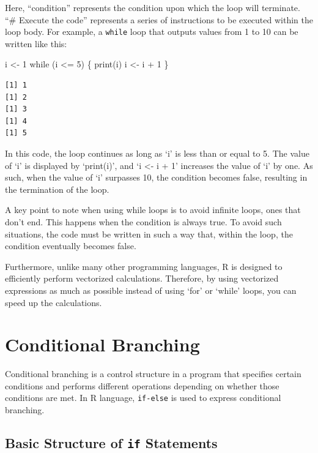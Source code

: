 \documentclass[
  a4paper,
]{book}
\newenvironment{Shaded}{\begin{snugshade}}{\end{snugshade}}
\newcommand{\ControlFlowTok}[1]{\textcolor[rgb]{0.00,0.23,0.31}{#1}}
\newcommand{\DecValTok}[1]{\textcolor[rgb]{0.68,0.00,0.00}{#1}}
\newcommand{\FunctionTok}[1]{\textcolor[rgb]{0.28,0.35,0.67}{#1}}
\newcommand{\NormalTok}[1]{\textcolor[rgb]{0.00,0.23,0.31}{#1}}
\newcommand{\OtherTok}[1]{\textcolor[rgb]{0.00,0.23,0.31}{#1}}
\newcommand{\SpecialCharTok}[1]{\textcolor[rgb]{0.37,0.37,0.37}{#1}}
\begin{document}
Here, ``condition'' represents the condition upon which the loop will
terminate. ``\# Execute the code'' represents a series of instructions
to be executed within the loop body. For example, a \texttt{while} loop
that outputs values from 1 to 10 can be written like this:

\begin{Shaded}
\begin{Highlighting}[]
\NormalTok{i }\OtherTok{\textless{}{-}} \DecValTok{1}
\ControlFlowTok{while}\NormalTok{ (i }\SpecialCharTok{\textless{}=} \DecValTok{5}\NormalTok{) \{}
  \FunctionTok{print}\NormalTok{(i)}
\NormalTok{  i }\OtherTok{\textless{}{-}}\NormalTok{ i }\SpecialCharTok{+} \DecValTok{1}
\NormalTok{\}}
\end{Highlighting}
\end{Shaded}

\begin{verbatim}
[1] 1
[1] 2
[1] 3
[1] 4
[1] 5
\end{verbatim}

In this code, the loop continues as long as `i' is less than or equal to
5. The value of `i' is displayed by `print(i)', and `i \textless- i + 1'
increases the value of `i' by one. As such, when the value of `i'
surpasses 10, the condition becomes false, resulting in the termination
of the loop.

A key point to note when using while loops is to avoid infinite loops,
ones that don't end. This happens when the condition is always true. To
avoid such situations, the code must be written in such a way that,
within the loop, the condition eventually becomes false.

Furthermore, unlike many other programming languages, R is designed to
efficiently perform vectorized calculations. Therefore, by using
vectorized expressions as much as possible instead of using `for' or
`while' loops, you can speed up the calculations.

\section{Conditional Branching}\label{conditional-branching}

Conditional branching is a control structure in a program that specifies
certain conditions and performs different operations depending on
whether those conditions are met. In R language, \texttt{if-else} is
used to express conditional branching.

\subsection{\texorpdfstring{Basic Structure of \texttt{if}
Statements}{Basic Structure of if Statements}}\label{basic-structure-of-if-statements}
\end{document}

